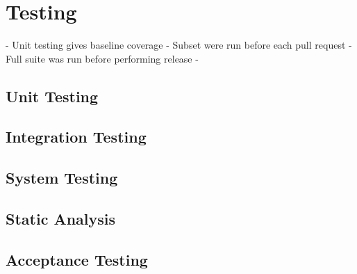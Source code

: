 \chapter{Testing}

- Unit testing gives baseline coverage
- Subset were run before each pull request
- Full suite was run before performing release
- 

\section{Unit Testing}
    

\section{Integration Testing}
    

\section{System Testing}
    

\section{Static Analysis}
    

\section{Acceptance Testing}
    
